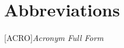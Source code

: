\frontmatter  %

\tableofcontents

\pagebreak
\chapter*{Abbreviations}

\begin{acronym}[ThisIsQuiteLongEnough]
	[ACRO]{\textit{Acronym Full Form}}
\end{acronym}

\iffalse
\chapter*{Glossary}
\begin{acronym}[ThisIsQuiteLongEnough]
	\setstretch{1.25}
	\acro{xxxLABLExxx}%
	[Term]{%
		Definition.
	}
\end{acronym}
\fi

\pagebreak
\listoftables
\pagebreak
\listoffigures
\pagebreak
\lstlistoflistings

\mainmatter %
